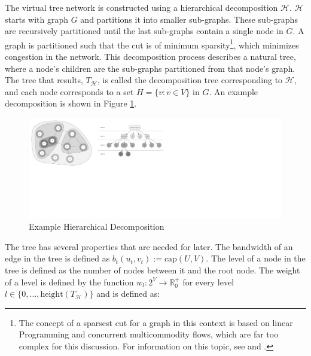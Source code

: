 The virtual tree network is constructed using a hierarchical decomposition $\mathscr{H} $. $\mathscr{H} $ starts with graph $G$ and partitions it into smaller sub-graphs. These sub-graphs are recursively partitioned until the last sub-graphs contain a single node in $G$. A graph is partitioned such that the cut is of minimum sparsity\footnote{The concept of a sparsest cut for a graph in this context is based on linear Programming and concurrent multicommodity flows, which are far too complex for this discussion. For information on this topic, see \cite{ref:2003-racke-oblivious_routing} and \cite{ref:1993-ahuja-network_flows}.}, which minimizes congestion in the network. This decomposition process describes a natural tree, where a node's children are the sub-graphs partitioned from that node's graph. The tree that results, $T_\mathscr{H} $, is called the decomposition tree corresponding to $\mathscr{H} $, and each node corresponds to a set $H=\{ v: v \in V\} $ in $G$. An example decomposition is shown in Figure \ref{fig:routing:ex_hierarchical_decomposition}.

\begin{landscape}
	\begin{figure}[p]
		\begin{centering}
			\includegraphics[width=8.5in]{Routing/Figures/routing-ex_hierarchical_decomposition.pdf}
			\caption{Example Hierarchical Decomposition}
			\label{fig:routing:ex_hierarchical_decomposition}
		\end{centering}
	\end{figure}
\end{landscape}

The tree has several properties that are needed for later. The bandwidth of an edge in the tree is defined as $b_t(u_t,v_t):=\textrm{cap}(U,V) $. The level of a node in the tree is defined as the number of nodes between it and the root node. The weight of a level is defined by the function $w_l:2^V\rightarrow \mathbb{R}^+_0 $  for every level $l\in \{ 0,...,\textrm{height}(T_\mathscr{H} )\} $ and is defined as:

